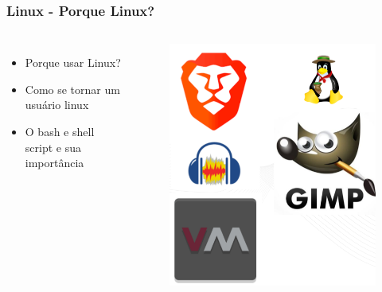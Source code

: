 \documentclass[    
  12pt, 
  compress,
  aspectratio=169,
  blue
  ]{beamer}
\begin{document}
\begin{frame}
\frametitle{ Linux - Porque Linux?}   
\begin{columns}[c]
\begin{itemize}
\item<1-> Porque usar Linux?
\item<2-> Como se tornar um usuário linux
\item<3-> O bash e shell script e sua importância
\end{itemize}
\centering
\begin{figure}
\includegraphics[scale=0.3]{programas}
\end{figure}
\end{columns}
\end{frame}
\end{document}
